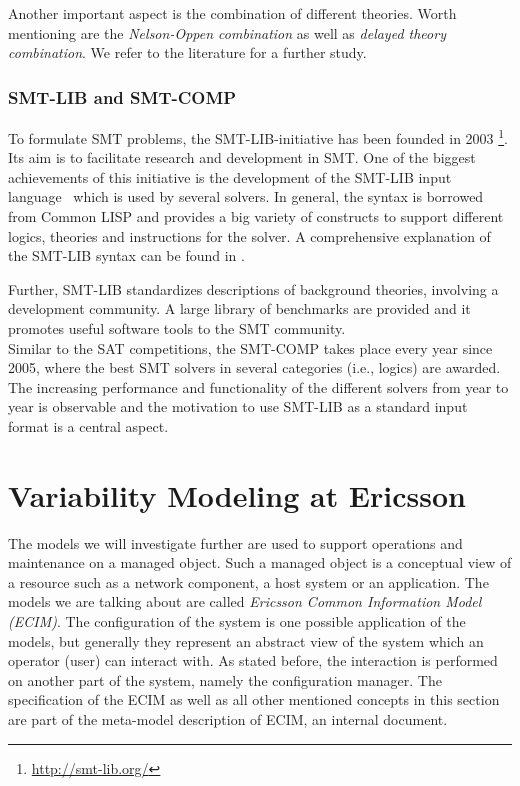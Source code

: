 Another important aspect is the combination of different theories. Worth mentioning are the \emph{Nelson-Oppen combination} as well as \emph{delayed theory combination}. We refer to the literature for a further study.

\subsubsection*{SMT-LIB and SMT-COMP}

To formulate SMT problems, the SMT-LIB-initiative has been founded in 2003 \footnote{\url{http://smt-lib.org/}}. 
Its aim is to facilitate research and development in SMT. One of the biggest achievements of this initiative is the development of the SMT-LIB input language~\cite{smt-lib2} which is used by several solvers. In general, the syntax is borrowed from Common LISP and provides a big variety of constructs to support different logics, theories and instructions for the solver. A comprehensive explanation of the SMT-LIB syntax can be found in \cite{smt-lib2}. 

Further, SMT-LIB standardizes descriptions of background theories, involving a development community. A large library of benchmarks are provided and it promotes useful software tools to the SMT community. \\

Similar to the SAT competitions, the SMT-COMP takes place every year since 2005, where the best SMT solvers in several categories (i.e., logics) are awarded. The increasing performance and functionality of the different solvers from year to year is observable and the motivation to use SMT-LIB as a standard input format is a central aspect.


\section{Variability Modeling at Ericsson}\label{sec:ericsson}

The models we will investigate further are used to support operations and maintenance on a managed object. Such a managed object is a conceptual view of a resource such as a network component, a host system or an application. The models we are talking about are called \emph{Ericsson Common Information Model (ECIM)}. The configuration of the system is one possible application of the models, but generally they represent an abstract view of the system which an operator (user) can interact with. As stated before, the interaction is performed on another part of the system, namely the configuration manager. The specification of the ECIM as well as all other mentioned concepts in this section are part of the meta-model description of ECIM, an internal document.

